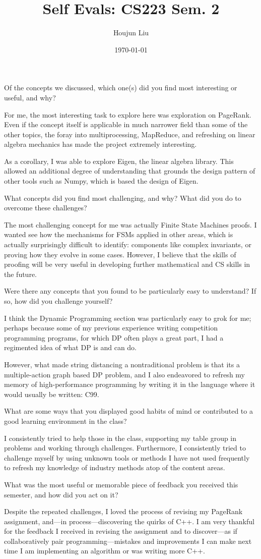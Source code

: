 \documentclass[letterpaper]{article}
\author{Houjun Liu}
\date{\today}
\title{Self Evals: CS223 Sem. 2}
\renewcommand{\tableofcontents}{}
\renewcommand\maketitle{}
\begin{document}
\maketitle
\tableofcontents

Of the concepts we discussed, which one(s) did you find most interesting or useful, and why?

For me, the most interesting task to explore here was exploration on PageRank. Even if the concept itself is applicable in much narrower field than some of the other topics, the foray into multiprocessing, MapReduce, and refreshing on linear algebra mechanics has made the project extremely interesting.

As a corollary, I was able to explore Eigen, the linear algebra library. This allowed an additional degree of understanding that grounds the design pattern of other tools such as Numpy, which is based the design of Eigen.

What concepts did you find most challenging, and why? What did you do to overcome these challenges?

The most challenging concept for me was actually Finite State Machines proofs. I wanted see how the mechanisms for FSMs applied in other areas, which is actually surprisingly difficult to identify: components like complex invariants, or proving how they evolve in some cases. However, I believe that the skills of proofing will be very useful in developing further mathematical and CS skills in the future.

Were there any concepts that you found to be particularly easy to understand? If so, how did you challenge yourself?

I think the Dynamic Programming section was particularly easy to grok for me; perhaps because some of my previous experience writing competition programming programs, for which DP often plays a great part, I had a regimented idea of what DP is and can do.

However, what made string distancing a nontraditional problem is that its a multiple-action graph based DP problem, and I also endeavored to refresh my memory of high-performance programming by writing it in the language where it would usually be written: C99.

What are some ways that you displayed good habits of mind or contributed to a good learning environment in the class?

I consistently tried to help those in the class, supporting my table group in problems and working through challenges. Furthermore, I consistently tried to challenge myself by using unknown tools or methods I have not used frequently to refresh my knowledge of industry methods atop of the content areas.

What was the most useful or memorable piece of feedback you received this semester, and how did you act on it?

Despite the repeated challenges, I loved the process of revising my PageRank assignment, and---in process---discovering the quirks of C++. I am very thankful for the feedback I received in revising the assignment and to discover---as if collaboratively pair programming---mistakes and improvements I can make next time I am implementing an algorithm or was writing more C++.
\end{document}

